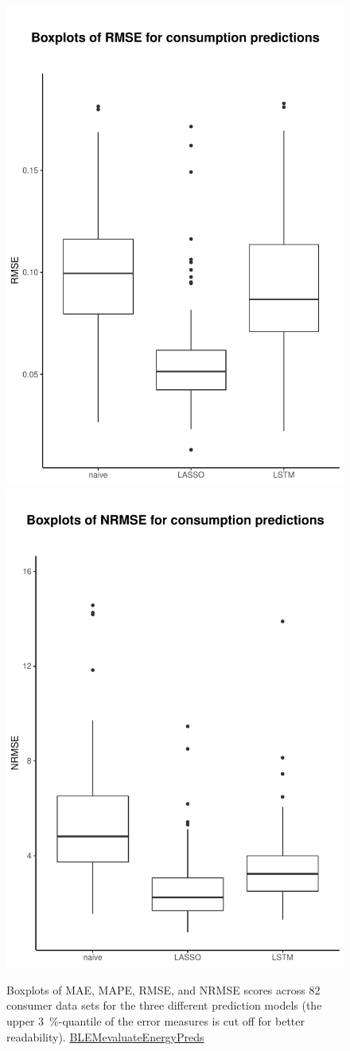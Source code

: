 \begin{figure}
    \includegraphics[width=.5\textwidth-5pt]{thesis/graphs/evaluation/c_boxplot_RMSE.pdf}
    \includegraphics[width=.5\textwidth-5pt]{thesis/graphs/evaluation/c_boxplot_NRMSE.pdf} \\
    \caption[Boxplots of MAE, MAPE, RMSE, and NRMSE scores across consumer data sets]{Boxplots of MAE, MAPE, RMSE, and NRMSE scores across 82 consumer data sets for the three different prediction models (the upper 3~\%-quantile of the error measures is cut off for better readability). \quantnet\href{https://github.com/QuantLet/BLEM/tree/master/BLEMevaluateEnergyPreds}{BLEMevaluateEnergyPreds}}
    \label{Fig:boxplots_errormeasures}
\end{figure}
%

